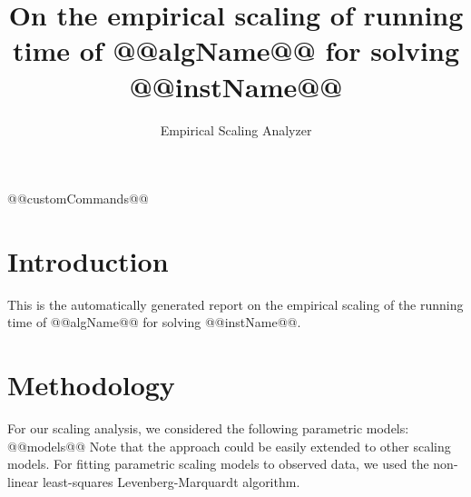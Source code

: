 \newcommand{\updatedYP}[1]{#1}
\newcommand{\yp}[1]{#1}
\newcommand{\orange}[1]{#1}
\newcommand{\evalModels}[1]{#1}
\newcommand{\bestBoot}[1]{#1}

\newcommand{\medianInterval}[1]{}
\newcommand{\randomizedAlgorithm}[1]{}
@@customCommands@@

\makeatletter

\providecommand{\tabularnewline}{\\}


\title{On the empirical scaling of running time of @@algName@@ for solving @@instName@@}
\author{Empirical Scaling Analyzer}

\makeatother

\usepackage{babel}

\maketitle %


\section{Introduction}

This is the automatically generated report on the empirical scaling
of the running time of @@algName@@ for solving @@instName@@.


\section{Methodology}

\label{sec:Methodology}

For our scaling analysis, we considered the following parametric models:
@@models@@
Note that the approach could be easily extended to other scaling models.
For fitting parametric scaling models to observed data, we used the
non-linear least-squares Levenberg-Marquardt algorithm.

